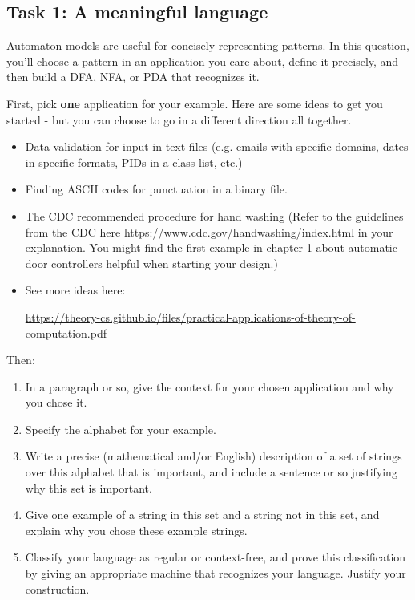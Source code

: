 \newpage
\subsection*{Task 1: A meaningful language}

Automaton models are useful for concisely representing patterns. 
In this question, you'll choose a pattern in an application you care about, 
define it precisely, and then build a DFA, NFA, or PDA that 
recognizes it.

First, pick {\bf one} application for your example. 
Here are some ideas to 
get you started - but you can choose to go in a different direction all together.
\begin{itemize}
\item Data validation for input in text files (e.g. emails with 
specific domains, dates in specific formats, PIDs in a class list, etc.)
\item Finding ASCII codes for punctuation in a binary file.
\item The CDC recommended procedure for hand washing (Refer to the guidelines from the CDC here https://www.cdc.gov/handwashing/index.html in your explanation. You might find the first example in chapter 1 about automatic door controllers helpful when starting your design.)
\item See more ideas here: 

{\scriptsize \url{https://theory-cs.github.io/files/practical-applications-of-theory-of-computation.pdf}}
\end{itemize}

Then:
\begin{enumerate}
    \item In a paragraph or so, give the context for your chosen
    application and why you chose it.
    \item Specify the alphabet for your example.
    \item Write a precise (mathematical and/or English) description
    of a set of strings over this alphabet that is important, 
    and include a sentence or so justifying why this set is important.
    \item Give one example of a string in this set and a string not 
    in this set, and explain why you chose these example strings.
    \item Classify your language as regular or context-free, and prove
    this classification by giving an appropriate machine that
    recognizes your language. Justify your construction.
\end{enumerate}

